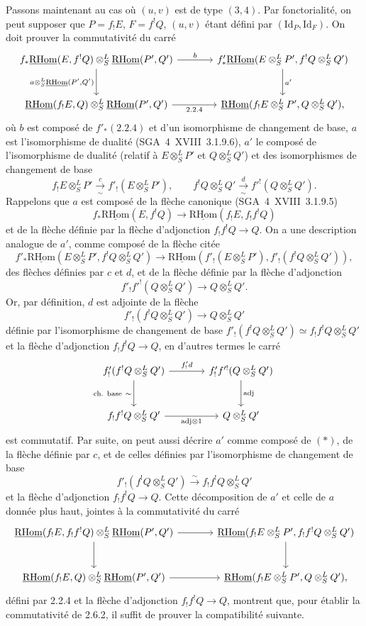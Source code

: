 \documentclass[11pt]{article}
\providecommand{\RHom}{\mathrm{RHom}}
\providecommand{\uRHom}{\underline{\RHom}}
\providecommand{\Id}{\mathrm{Id}}
\providecommand{\RHom}{\mathrm{RHom}}
\providecommand{\RHom}{\mathrm R\mathcal{H}om}
\providecommand{\RHom}{\mathrm{RHom}}
\begin{document}
Passons maintenant au cas où $(u,v)$ est de type $(3,4)$. Par fonctorialité, on peut supposer que $P=f_{!}E$, $F=f^{!}Q$, $(u,v)$ étant défini par $(\Id_P,\Id_F)$. On doit prouver la commutativité du carré
\[
\begin{tikzcd}[column sep=large,row sep=large]
f_*\uRHom(E,f^!Q)\otimes^L_S\uRHom(P',Q') \arrow[r,"b"] \arrow[d,"{a\otimes^L_S\uRHom(P',Q')}"'] & f'_*\uRHom(E\otimes^L_SP',f^!Q\otimes^L_SQ') \arrow[d,"a'"]\\
\uRHom(f_!E,Q)\otimes^L_S\uRHom(P',Q') \arrow[r,"2.2.4"'] & \uRHom(f_!E\otimes^L_SP',Q\otimes^L_SQ'),
\end{tikzcd}
\]
où $b$ est composé de $f'_*(2.2.4)$ et d'un isomorphisme de changement de base, $a$ est l'isomorphisme de dualité (SGA~4~XVIII~3.1.9.6), $a'$ le composé de l'isomorphisme de dualité (relatif à $E\otimes^L_SP'$ et $Q\otimes^L_SQ'$) et des isomorphismes de changement de base
\[
f_!E\otimes^L_SP'\xrightarrow[\sim]{c}f'_!(E\otimes^L_SP'),
\qquad
f^!Q\otimes^L_SQ'\xrightarrow[\sim]{d}f'^!(Q\otimes^L_SQ').
\]
Rappelons que $a$ est composé de la flèche canonique (SGA~4~XVIII~3.1.9.5)
\[
f_*\uRHom(E,f^!Q)\longrightarrow\uRHom(f_!E,f_!f^!Q)
\]
et de la flèche définie par la flèche d'adjonction $f_!f^!Q\to Q$. On a une description analogue de $a'$, comme composé de la flèche citée
\begin{equation}\tag{*}
f'_*\uRHom(E\otimes^L_SP',f^!Q\otimes^L_SQ')\longrightarrow
\uRHom(f'_!(E\otimes^L_SP'),f'_!(f^!Q\otimes^L_SQ')),
\end{equation}
des flèches définies par $c$ et $d$, et de la flèche définie par la flèche d'adjonction
\[
f'_!f'^!(Q\otimes^L_SQ')\longrightarrow Q\otimes^L_SQ'.
\]
Or, par définition, $d$ est adjointe de la flèche
\[
f'_!(f^!Q\otimes^L_SQ')\longrightarrow Q\otimes^L_SQ'
\]
définie par l'isomorphisme de changement de base $f'_!(f^!Q\otimes^L_SQ')\simeq f_!f^!Q\otimes^L_SQ'$ et la flèche d'adjonction $f_!f^!Q\to Q$, en d'autres termes le carré
\[
\begin{tikzcd}[column sep=large,row sep=large]
f'_!(f^!Q\otimes^L_SQ') \arrow[r,"{f'_!d}"] \arrow[d,"{\text{ch. base}\ \sim}"'] & f'_!f'^!(Q\otimes^L_SQ') \arrow[d,"\mathrm{adj}"]\\
f_!f^!Q\otimes^L_SQ' \arrow[r,"{\mathrm{adj}\otimes 1}"'] & Q\otimes^L_SQ'
\end{tikzcd}
\]
est commutatif. Par suite, on peut aussi décrire $a'$ comme composé de $(*)$, de la flèche définie par $c$, et de celles définies par l'isomorphisme de changement de base
\[
f'_!(f^!Q\otimes^L_SQ')\xrightarrow{\sim}f_!f^!Q\otimes^L_SQ'
\]
et la flèche d'adjonction $f_!f^!Q\to Q$. Cette décomposition de $a'$ et celle de $a$ donnée plus haut, jointes à la commutativité du carré
\[
\begin{tikzcd}[column sep=large,row sep=large]
\uRHom(f_!E,f_!f^!Q)\otimes^L_S\uRHom(P',Q') \arrow[r] \arrow[d] & \uRHom(f_!E\otimes^L_SP',f_!f^!Q\otimes^L_SQ') \arrow[d]\\
\uRHom(f_!E,Q)\otimes^L_S\uRHom(P',Q') \arrow[r] & \uRHom(f_!E\otimes^L_SP',Q\otimes^L_SQ'),
\end{tikzcd}
\]
défini par 2.2.4 et la flèche d'adjonction $f_!f^!Q\to Q$, montrent que, pour établir la commutativité de 2.6.2, il suffit de prouver la compatibilité suivante.
\end{document}
